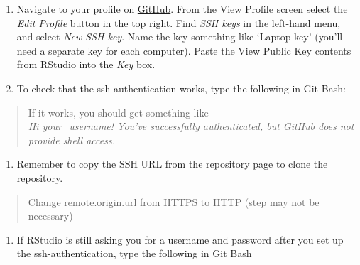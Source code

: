\documentclass[12pt,]{article}
\providecommand{\tightlist}{%
  \setlength{\itemsep}{0pt}\setlength{\parskip}{0pt}}
\begin{document}
\begin{enumerate}
\def\labelenumi{\arabic{enumi}.}
\setcounter{enumi}{8}
\item
  Navigate to your profile on \href{www.github.com}{GitHub}. From the
  View Profile screen select the \emph{Edit Profile} button in the top
  right. Find \emph{SSH keys} in the left-hand menu, and select
  \emph{New SSH key}. Name the key something like `Laptop key' (you'll
  need a separate key for each computer). Paste the View Public Key
  contents from RStudio into the \emph{Key} box.
\item
  To check that the ssh-authentication works, type the following in Git
  Bash:
\end{enumerate}

\begin{quote}
\colorbox{light-gray}{}
\end{quote}

\begin{quote}
If it works, you should get something like\\
\emph{Hi your\_username! You've successfully authenticated, but GitHub
does not provide shell access.}
\end{quote}

\begin{enumerate}
\def\labelenumi{\arabic{enumi}.}
\setcounter{enumi}{10}
\tightlist
\item
  Remember to copy the SSH URL from the repository page to clone the
  repository.
\end{enumerate}

\begin{quote}
Change remote.origin.url from HTTPS to HTTP (step may not be necessary)
\end{quote}

\begin{enumerate}
\def\labelenumi{\arabic{enumi}.}
\setcounter{enumi}{11}
\tightlist
\item
  If RStudio is still asking you for a username and password after you
  set up the ssh-authentication, type the following in Git Bash
\end{enumerate}

\begin{quote}
\colorbox{light-gray}{}
\end{quote}

\begin{quote}
\colorbox{light-gray}{}
\end{quote}
\end{document}
